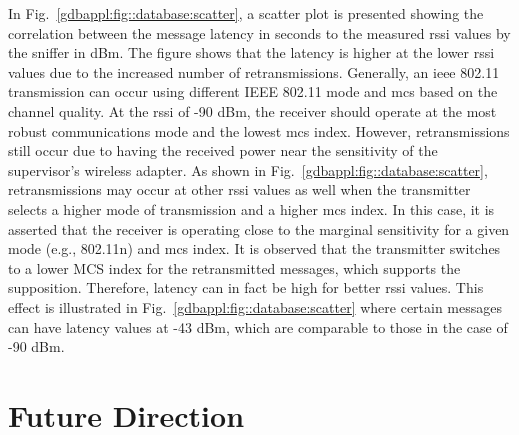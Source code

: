 In Fig.~\ref{gdbappl:fig::database:scatter}, a scatter plot is presented showing the correlation between the message latency in seconds to the measured \gls{rssi} values by the sniffer in dBm.  The figure shows that the latency is higher at the lower \gls{rssi} values due to the increased number of retransmissions. Generally, an \gls{ieee} 802.11 transmission can occur using different IEEE 802.11 mode and \gls{mcs} based on the channel quality. At the \gls{rssi} of -90 dBm, the receiver should operate at the most robust communications mode and the lowest \gls{mcs} index. However, retransmissions still occur due to having the received power near the sensitivity of the supervisor's wireless adapter. As shown in Fig.~\ref{gdbappl:fig::database:scatter}, retransmissions may occur at other \gls{rssi} values as well when the transmitter selects a higher mode of transmission and a higher \gls{mcs} index. In this case, it is asserted that the receiver is operating close to the marginal sensitivity for a given mode (e.g., 802.11n) and \gls{mcs} index.  It is observed that the transmitter switches to a lower MCS index for the retransmitted messages, which supports the supposition. Therefore, latency can in fact be high for better \gls{rssi} values.  This effect is illustrated in Fig.~\ref{gdbappl:fig::database:scatter} where certain messages can have latency values at -43 dBm, which are comparable to those in the case of -90 dBm.  





\section{Future Direction}

